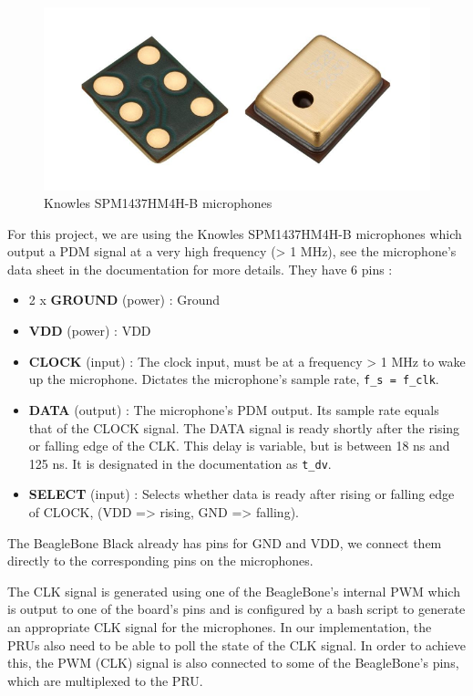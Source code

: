 \documentclass[]{report}
\providecommand{\tightlist}{%
	\setlength{\itemsep}{0pt}\setlength{\parskip}{0pt}}
\begin{document}
\begin{figure}[h]
\centering
\includegraphics[width=0.6\linewidth]{Pictures/mics.png}
\caption{Knowles SPM1437HM4H-B microphones}
\end{figure}

For this project, we are using the Knowles SPM1437HM4H-B microphones
which output a PDM signal at a very high frequency (\textgreater{} 1
MHz), see the microphone's data sheet in the documentation for more
details. They have 6 pins :

\begin{itemize}
\tightlist
\item
  2 x \textbf{GROUND} (power) : Ground
\item
  \textbf{VDD} (power) : VDD
\item
  \textbf{CLOCK} (input) : The clock input, must be at a frequency
  \textgreater{} 1 MHz to wake up the microphone. Dictates the
  microphone's sample rate, \texttt{f\_s\ =\ f\_clk}.
\item
  \textbf{DATA} (output) : The microphone's PDM output. Its sample rate
  equals that of the CLOCK signal. The DATA signal is ready shortly
  after the rising or falling edge of the CLK. This delay is variable,
  but is between 18 ns and 125 ns. It is designated in the documentation
  as \texttt{t\_dv}.
\item
  \textbf{SELECT} (input) : Selects whether data is ready after rising
  or falling edge of CLOCK, (VDD =\textgreater{} rising, GND
  =\textgreater{} falling).
\end{itemize}

The BeagleBone Black already has pins for GND and VDD, we connect them directly to the corresponding pins on the microphones.

The CLK signal is generated using one of the BeagleBone's internal PWM which is output to one of the board's pins and is configured by a bash script to generate an appropriate CLK signal for the microphones. In our implementation, the PRUs also need to be able to poll the state of the CLK signal. In order to achieve this, the PWM (CLK) signal is also connected to some of the BeagleBone's pins, which are multiplexed to the PRU.
\end{document}
